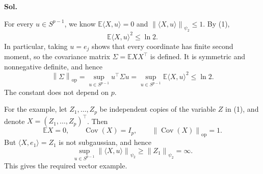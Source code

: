 \documentclass[lang=en,11pt,a4paper,citestyle=authoryear,nobib=true]{elegantpaper}
\newcommand{\E}{\mathbb{E}}
\newcommand{\norm}[1]{\left\lVert#1\right\rVert}
\begin{document}
\begin{enumerate}[label=(\arabic*),leftmargin=*]
\par\vspace{0.5em}\noindent\textbf{Sol.}\par
For every $u\in S^{p-1}$, we know
$\E\langle X,u\rangle=0$ and
$\norm{\langle X,u\rangle}_{\psi_2}\le1$. By (1),
\[
\E\langle X,u\rangle^2\le\ln2.
\]
In particular, taking $u=e_j$ shows that every coordinate has finite
second moment, so the covariance matrix $\Sigma=\E XX^\top$ is defined.
It is symmetric and nonnegative definite, and hence
\[
\norm{\Sigma}_{\mathrm{op}}
=\sup_{u\in S^{p-1}}u^\top\Sigma u
=\sup_{u\in S^{p-1}}\E\langle X,u\rangle^2
\le\ln2.
\]
The constant does not depend on $p$.

For the example, let $Z_1,\ldots,Z_p$ be independent copies of the
variable $Z$ in (1), and denote $X=(Z_1,\ldots,Z_p)^\top$. Then
\[
\E X=0,\qquad\operatorname{Cov}(X)=I_p,
\qquad\norm{\operatorname{Cov}(X)}_{\mathrm{op}}=1.
\]
But $\langle X,e_1\rangle=Z_1$ is not subgaussian, and hence
\[
\sup_{u\in S^{p-1}}\norm{\langle X,u\rangle}_{\psi_2}
\ge\norm{Z_1}_{\psi_2}=\infty.
\]
This gives the required vector example.
\end{enumerate}
\end{document}
